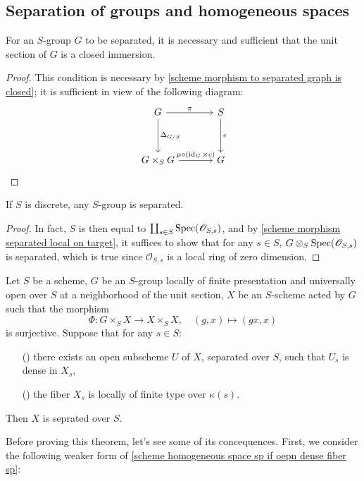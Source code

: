 \subsection{Separation of groups and homogeneous spaces}
\begin{proposition}
For an $S$-group $G$ to be separated, it is necessary and sufficient that the unit section of $G$ is a closed immersion.
\end{proposition}
\begin{proof}
This condition is necessary by \cref{scheme morphism to separated graph is closed}; it is sufficient in view of the following diagram:
\begin{equation*}
\begin{tikzcd}[row sep=12mm, column sep=12mm]
G\ar[d,"\Delta_{G/S}"]\ar[r,"\pi"]&S\ar[d,"e"]\\
G\times_SG\ar[r,"\mu\circ(\id_G\times c)"]&G
\end{tikzcd}\qedhere
\end{equation*}
\end{proof}

\begin{proposition}\label{scheme group over discrete base separated}
If $S$ is discrete, any $S$-group is separated.
\end{proposition}
\begin{proof}
In fact, $S$ is then equal to $\coprod_{s\in S}\mathrm{Spec}(\mathscr{O}_{S,s})$, and by \cref{scheme morphism separated local on target}, it suffices to show that for any $s\in S$, $G\otimes_S\mathrm{Spec}(\mathscr{O}_{S,s})$ is separated, which is true since $\mathscr{O}_{S,s}$ is a local ring of zero dimension, 
\end{proof}

\begin{theorem}\label{scheme homogeneous space sp if oepn dense fiber sp}
Let $S$ be a scheme, $G$ be an $S$-group locally of finite presentation and universally open over $S$ at a neighborhood of the unit section, $X$ be an $S$-scheme acted by $G$ such that the morphism
\[\Phi:G\times_SX\to X\times_SX,\quad (g,x)\mapsto (gx,x)\]
is surjective. Suppose that for any $s\in S$:
\begin{enumerate}
    \item[(\rmnum{1})] there exists an open subscheme $U$ of $X$, separated over $S$, such that $U_s$ is dense in $X_s$,
    \item[(\rmnum{2})] the fiber $X_s$ is locally of finite type over $\kappa(s)$.
\end{enumerate}
Then $X$ is seprated over $S$.
\end{theorem}
Before proving this theorem, let's see some of its concequences. First, we consider the following weaker form of \cref{scheme homogeneous space sp if oepn dense fiber sp}:

